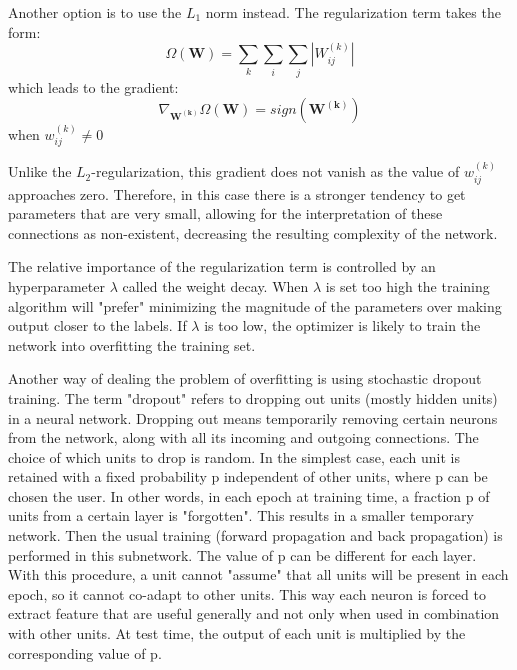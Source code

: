 Another option is to use the $L_1$ norm instead. The regularization term takes the form:
\begin{equation}
\Omega \left( \mathbf{W} \right) = \sum_k \sum_i \sum_j | W_{ij}^{(k)} |
\label{eq:L1-reg}
\end{equation}
which leads to the gradient:
\begin{equation}
\nabla_{\mathbf{W^{(k)}}} \Omega \left( \mathbf{W} \right) = sign \left( \mathbf{W^{(k)}} \right)
\label{eq:L1-reg-grad}
\end{equation}
when $w_{ij}^{(k)} \neq 0$

Unlike the $L_2$-regularization, this gradient does not vanish as the value of $w_{ij}^{(k)}$ approaches zero. Therefore, in this case there is a stronger tendency to get parameters that are very small, allowing for the interpretation of these connections as non-existent, decreasing the resulting complexity of the network.

The relative importance of the regularization term is controlled by an hyperparameter $\lambda$ called the weight decay. When $\lambda$ is set too high the training algorithm will "prefer" minimizing the magnitude of the parameters over making output closer to the labels. If $\lambda$ is too low, the optimizer is likely to train the network into overfitting the training set. \cite{Larochelleyoutube}

Another way of dealing the problem of overfitting is using stochastic dropout training.
The term "dropout" refers to dropping out units (mostly hidden units) in a neural network. Dropping out means temporarily removing certain neurons from the network, along with all its incoming and outgoing connections. The choice of which units to drop is random. In the simplest case, each unit is retained with a fixed probability p independent of other units, where p can be chosen the user.
In other words, in each epoch at training time, a fraction p of units from a certain layer is "forgotten". This results in a smaller temporary network. Then the usual training (forward propagation and back propagation) is performed in this subnetwork. The value of p can be different for each layer.
With this procedure, a unit cannot "assume" that all units will be present in each epoch, so it cannot co-adapt to other units. This way each neuron is forced to extract feature that are useful generally and not only when used in combination with other units.
At test time, the output of each unit is multiplied by the corresponding value of p. \cite{Hinton2012} \cite{srivastava14}
